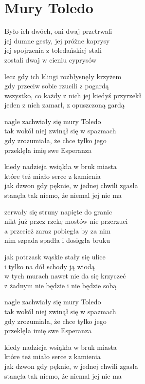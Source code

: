 \section{Mury Toledo}
\begin{text}
Było ich dwóch, oni dwaj przetrwali\\
jej dumne gesty, jej próżne kaprysy\\
jej spojrzenia z toledańskiej stali\\
zostali dwaj w cieniu cyprysów

lecz gdy ich klingi rozbłysnęły krzyżem\\
gdy przeciw sobie rzucili z pogardą\\
wszystko, co każdy z nich jej kiedyś przyrzekł\\
jeden z nich zamarł, z opuszczoną gardą

nagle zachwiały się mury Toledo\\
tak wokół niej zwinął się w spazmach\\
gdy zrozumiała, że chce tylko jego\\
przeklęła imię swe Esperanza

kiedy nadzieja wsiąkła w bruk miasta\\
które też miało serce z kamienia\\
jak dzwon gdy pęknie, w jednej chwili zgasła\\
stanęła tak niemo, że niemal jej nie ma

zerwały się struny napięte do granic\\
nikt już przez rzekę mostów nie przerzuci\\
a przecież zaraz pobiegła by za nim\\
nim szpada spadła i dosięgła bruku

jak potrzask wąskie stały się ulice\\
i tylko na dół schody ją wiodą\\
w tych murach nawet nie da się krzyczeć\\
z żadnym nie będzie i nie będzie sobą

nagle zachwiały się mury Toledo\\
tak wokół niej zwinął się w spazmach\\
gdy zrozumiała, że chce tylko jego\\
przeklęła imię swe Esperanza

kiedy nadzieja wsiąkła w bruk miasta\\
które też miało serce z kamienia\\
jak dzwon gdy pęknie, w jednej chwili zgasła\\
stanęła tak niemo, że niemal jej nie ma
\end{text}